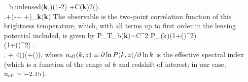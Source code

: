 \delta{}_{\rm b,unlensed}({\bf{k}},)(1-2\kappa) +C\left\lbrace \tilde{\delta}({\bf{k}})2(\cdot{})\right.\\
\left.+\left(-+\bm{\sigma}
+\bm{\Omega}\right)\cdot\bm{\nabla}_{\bf{k}}\tilde{\delta}({\bf{k}})\right\rbrace
\ega
\eeq
The observable is the two-point correlation function of this brightness temperature, which, with all terms up to first order in the lensing potential included, is given by
\beq
\bga
P_{T_{\rm b}}({\bf{k}})=C^2 P_{\delta}(k)\left(1+(\cdot{})^2\right) \times\\
\left\lbrace \left(1+(\cdot{})^2\right) \right.\\
\left. + 4(\cdot{})\left(\cdot\bm{\sigma}\cdot{}+(\bm{\Omega}\times{})\cdot{}\right)\right\rbrace,
\label{eq:Tb_power}
\ega
\eeq
where $n_{\rm eff}(k,z)\equiv \partial\ln P(k,z)/\partial\ln k$ is the effective spectral index (which is a function of the range of $k$ and redshift of interest; in our case, $n_{\rm eff}\sim -2.15$).

